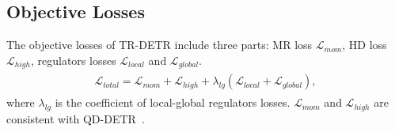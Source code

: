 \subsection{Objective Losses}
The objective losses of TR-DETR include three parts: MR loss $\mathcal{L}_{mom}$, HD loss $\mathcal{L}_{high}$, regulators losses $\mathcal{L}_{local}$ and $\mathcal{L}_{global}$.
\begin{align}
    \begin{aligned}
        \mathcal{L}_{total}=\mathcal{L}_{mom}+\mathcal{L}_{high}+\lambda_{lg}(\mathcal{L}_{local}+\mathcal{L}_{global}),
    \end{aligned}
\end{align}
where $\lambda_{lg}$ is the coefficient of local-global regulators losses. $\mathcal{L}_{mom}$ and $\mathcal{L}_{high}$ are consistent with QD-DETR~\cite{moon2023query}.

